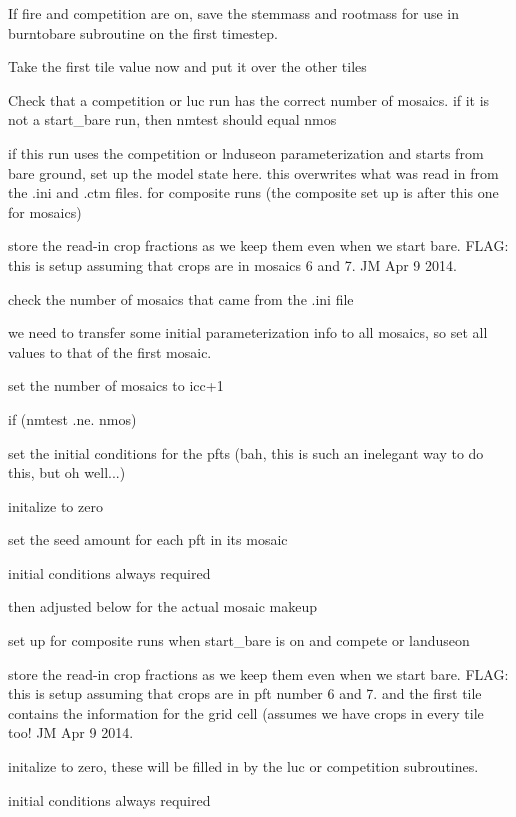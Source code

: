 If fire and competition are on, save the stemmass and rootmass for use in burntobare subroutine on the first timestep.

Take the first tile value now and put it over the other tiles

Check that a competition or luc run has the correct number of mosaics. if it is not a start\+\_\+bare run, then nmtest should equal nmos

if this run uses the competition or lnduseon parameterization and starts from bare ground, set up the model state here. this overwrites what was read in from the .ini and .ctm files. for composite runs (the composite set up is after this one for mosaics)

store the read-\/in crop fractions as we keep them even when we start bare. F\+L\+A\+G\+: this is setup assuming that crops are in mosaics 6 and 7. J\+M Apr 9 2014.

check the number of mosaics that came from the .ini file

we need to transfer some initial parameterization info to all mosaics, so set all values to that of the first mosaic.

set the number of mosaics to icc+1

if (nmtest .ne. nmos)

set the initial conditions for the pfts (bah, this is such an inelegant way to do this, but oh well...)

initalize to zero

set the seed amount for each pft in its mosaic

initial conditions always required

then adjusted below for the actual mosaic makeup

set up for composite runs when start\+\_\+bare is on and compete or landuseon

store the read-\/in crop fractions as we keep them even when we start bare. F\+L\+A\+G\+: this is setup assuming that crops are in pft number 6 and 7. and the first tile contains the information for the grid cell (assumes we have crops in every tile too! J\+M Apr 9 2014.

initalize to zero, these will be filled in by the luc or competition subroutines.

initial conditions always required 